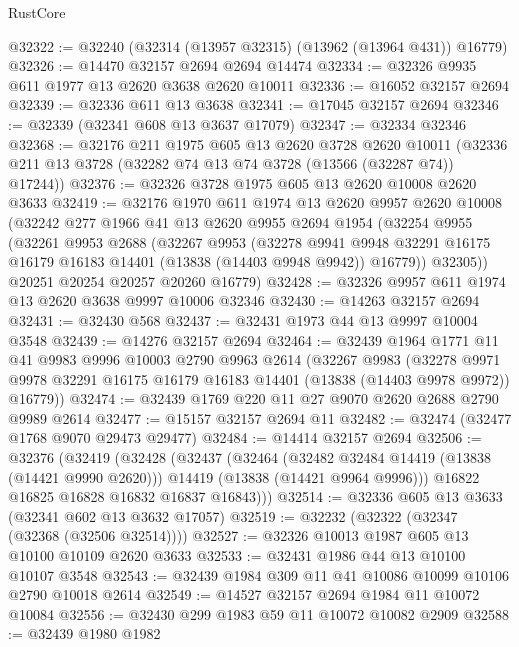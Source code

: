 \begin{lexlean}{RustCore}
\begin{coremodule}
@32322 := @32240 (@32314 (@13957 @32315) (@13962 (@13964 @431)) @16779)
@32326 := @14470 @32157 @2694 @2694 @14474
@32334 := @32326 @9935 @611 @1977 @13 @2620 @3638 @2620 @10011
@32336 := @16052 @32157 @2694
@32339 := @32336 @611 @13 @3638
@32341 := @17045 @32157 @2694
@32346 := @32339 (@32341 @608 @13 @3637 @17079)
@32347 := @32334 @32346
@32368 := @32176
    @211
    @1975
    @605
    @13
    @2620
    @3728
    @2620
    @10011
    (@32336 @211 @13 @3728 (@32282 @74 @13 @74 @3728 (@13566 (@32287 @74)) @17244))
@32376 := @32326 @3728 @1975 @605 @13 @2620 @10008 @2620 @3633
@32419 := @32176
    @1970
    @611
    @1974
    @13
    @2620
    @9957
    @2620
    @10008
    (@32242
      @277
      @1966
      @41
      @13
      @2620
      @9955
      @2694
      @1954
      (@32254
        @9955
        (@32261
          @9953
          @2688
          (@32267
            @9953
            (@32278
              @9941
              @9948
              @32291
              @16175
              @16179
              @16183
              @14401
              (@13838 (@14403 @9948 @9942))
              @16779))
          @32305))
      @20251
      @20254
      @20257
      @20260
      @16779)
@32428 := @32326 @9957 @611 @1974 @13 @2620 @3638 @9997 @10006 @32346
@32430 := @14263 @32157 @2694
@32431 := @32430 @568
@32437 := @32431 @1973 @44 @13 @9997 @10004 @3548
@32439 := @14276 @32157 @2694
@32464 := @32439
    @1964
    @1771
    @11
    @41
    @9983
    @9996
    @10003
    @2790
    @9963
    @2614
    (@32267
      @9983
      (@32278 @9971 @9978 @32291 @16175 @16179 @16183 @14401 (@13838 (@14403 @9978 @9972)) @16779))
@32474 := @32439 @1769 @220 @11 @27 @9070 @2620 @2688 @2790 @9989 @2614
@32477 := @15157 @32157 @2694 @11
@32482 := @32474 (@32477 @1768 @9070 @29473 @29477)
@32484 := @14414 @32157 @2694
@32506 := @32376
    (@32419
      (@32428
        (@32437
          (@32464
            (@32482 @32484 @14419 (@13838 (@14421 @9990 @2620)))
            @14419
            (@13838 (@14421 @9964 @9996)))
          @16822
          @16825
          @16828
          @16832
          @16837
          @16843)))
@32514 := @32336 @605 @13 @3633 (@32341 @602 @13 @3632 @17057)
@32519 := @32232 (@32322 (@32347 (@32368 (@32506 @32514))))
@32527 := @32326 @10013 @1987 @605 @13 @10100 @10109 @2620 @3633
@32533 := @32431 @1986 @44 @13 @10100 @10107 @3548
@32543 := @32439 @1984 @309 @11 @41 @10086 @10099 @10106 @2790 @10018 @2614
@32549 := @14527 @32157 @2694 @1984 @11 @10072 @10084
@32556 := @32430 @299 @1983 @59 @11 @10072 @10082 @2909
@32588 := @32439
    @1980
    @1982

\end{coremodule}
\end{lexlean}
